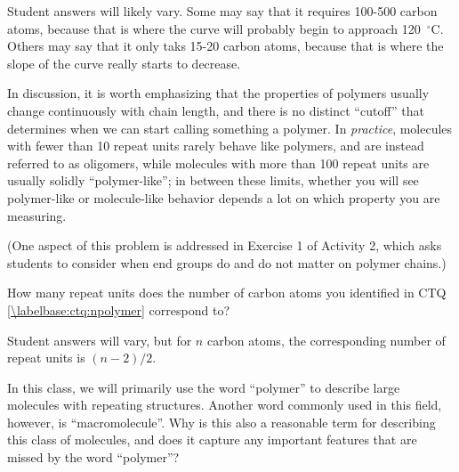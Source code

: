 \begin{activity}
\begin{ctqs}
		\begin{solution}[2in]
		
			Student answers will likely vary.  Some may say that it requires 100-500 carbon atoms, because that is where the curve will probably begin to approach 120~${}^\circ$C.  Others may say that it only taks 15-20 carbon atoms, because that is where the slope of the curve really starts to decrease.
			
			In discussion, it is worth emphasizing that the properties of polymers usually change continuously with chain length, and there is no distinct ``cutoff'' that determines when we can start calling something a polymer.  In \emph{practice}, molecules with fewer than 10 repeat units rarely behave like polymers, and are instead referred to as oligomers, while molecules with more than 100 repeat units are usually solidly ``polymer-like''; in between these limits, whether you will see polymer-like or molecule-like behavior depends a lot on which property you are measuring.
			
			(One aspect of this problem is addressed in Exercise 1 of Activity 2, which asks students to consider when end groups do and do not matter on polymer chains.)
		\end{solution}
	
	
			
\end{ctqs}

		

\begin{exercises}

	\exercise How many repeat units does the number of carbon atoms you identified in CTQ \ref{\labelbase:ctq:npolymer} correspond to?
	
		\begin{solution}
		
			Student answers will vary, but for $n$ carbon atoms, the corresponding number of repeat units is $(n-2)/2$.
			
		\end{solution}

	\exercise In this class, we will primarily use the word ``polymer'' to describe large molecules with repeating structures.  Another word commonly used in this field, however, is ``macromolecule''.  Why is this also a reasonable term for describing this class of molecules, and does it capture any important features that are missed by the word ``polymer''?
	

\end{exercises}
\end{activity}
